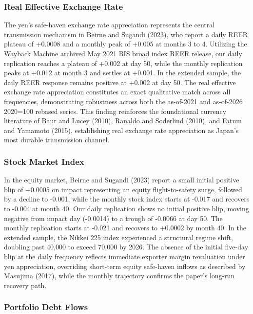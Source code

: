 \subsubsection{Real Effective Exchange Rate}

The yen's safe-haven exchange rate appreciation represents the central transmission mechanism in Beirne and Sugandi (2023), who report a daily REER plateau of +0.0008 and a monthly peak of +0.005 at months 3 to 4. Utilizing the Wayback Machine archived May 2021 BIS broad index REER release, our daily replication reaches a plateau of +0.002 at day 50, while the monthly replication peaks at +0.012 at month 3 and settles at +0.001. In the extended sample, the daily REER response remains positive at +0.002 at day 50. The real effective exchange rate appreciation constitutes an exact qualitative match across all frequencies, demonstrating robustness across both the as-of-2021 and as-of-2026 2020=100 rebased series. This finding reinforces the foundational currency literature of Baur and Lucey (2010), Ranaldo and Soderlind (2010), and Fatum and Yamamoto (2015), establishing real exchange rate appreciation as Japan's most durable transmission channel.

\subsubsection{Stock Market Index}

In the equity market, Beirne and Sugandi (2023) report a small initial positive blip of +0.0005 on impact representing an equity flight-to-safety surge, followed by a decline to -0.001, while the monthly stock index starts at -0.017 and recovers to -0.004 at month 40. Our daily replication shows no initial positive blip, moving negative from impact day (-0.0014) to a trough of -0.0066 at day 50. The monthly replication starts at -0.021 and recovers to +0.0002 by month 40. In the extended sample, the Nikkei 225 index experienced a structural regime shift, doubling past 40,000 to exceed 70,000 by 2026. The absence of the initial five-day blip at the daily frequency reflects immediate exporter margin revaluation under yen appreciation, overriding short-term equity safe-haven inflows as described by Masujima (2017), while the monthly trajectory confirms the paper's long-run recovery path.

\subsubsection{Portfolio Debt Flows}


